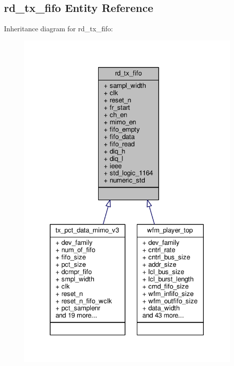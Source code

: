 \subsection{rd\+\_\+tx\+\_\+fifo Entity Reference}
\label{classrd__tx__fifo}


Inheritance diagram for rd\+\_\+tx\+\_\+fifo\+:\nopagebreak
\begin{figure}[H]
\begin{center}
\leavevmode
\includegraphics[width=312pt]{da/d44/classrd__tx__fifo__inherit__graph}
\end{center}
\end{figure}


